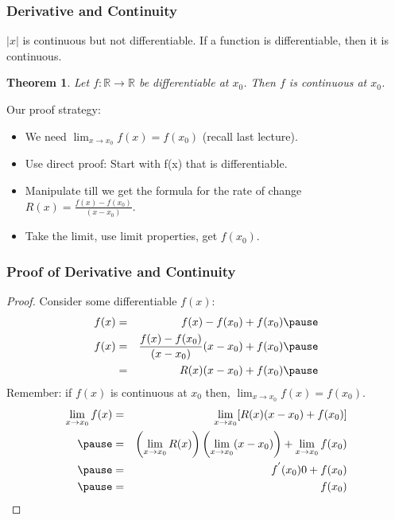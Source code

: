 \documentclass[aspectratio=169, handout]{beamer}
\newtheorem{thm}{Theorem}
\numberwithin{equation}{section}
\begin{document}
\begin{frame}
\frametitle{Derivative and Continuity}

$|x|$ is continuous but not differentiable. If a function is differentiable, then it is continuous.\pause

\begin{thm} Let $f:\mathbb{R} \rightarrow \mathbb{R}$ be differentiable at $x_{0}$.  Then $f$ is continuous at $x_{0}$.
\end{thm}
\pause
Our proof strategy: 
\begin{itemize}
\item We need $\lim_{x\rightarrow x_{0}} f(x) = f(x_{0})$ (recall last lecture).
\item Use direct proof: Start with f(x) that is differentiable.
\item Manipulate till we get the formula for the rate of change $R(x) =\frac{ f(x) - f(x_{0})}{(x- x_{0})}$. 
\item Take the limit, use limit properties, get $f(x_{0}).$
\end{itemize}
 \end{frame}



\begin{frame}
\frametitle{Proof of Derivative and Continuity}
\begin{proof}
Consider some differentiable $f(x)$: \pause 
\begin{eqnarray}
f(x) & =& f(x) -f(x_{0} )+f(x_{0}) \nonumber  \pause  \\
f(x) & = & \frac{ f(x) - f(x_{0})}{(x- x_{0})} (x - x_{0} ) + f(x_{0} )\nonumber  \pause  \\
& = & R(x) (x - x_{0} ) + f(x_{0} ) \nonumber \pause 
	\end{eqnarray}
Remember: if $f(x)$ is continuous at $x_{0}$ then, $\lim_{x\rightarrow x_{0}} f(x) = f(x_{0})$.  \pause 
\begin{eqnarray}
\lim_{x\rightarrow x_{0}} f(x) & = & \lim_{x\rightarrow x_{0} } [R(x) (x - x_{0} ) + f(x_{0}) ] \nonumber \\ \pause 
& = & \left(\lim_{x\rightarrow x_{0} } R(x) \right)\left(\lim_{x\rightarrow x_{0}} (x - x_{0}) \right)  + \lim_{x\rightarrow x_{0}} f(x_{0} ) \nonumber \\ \pause 
& = & f^{'}(x_{0} ) 0 + f(x_{0})  \nonumber \\\pause
& = &f(x_{0} ) \nonumber
	\end{eqnarray}

\end{proof}

\end{frame}
\end{document}

